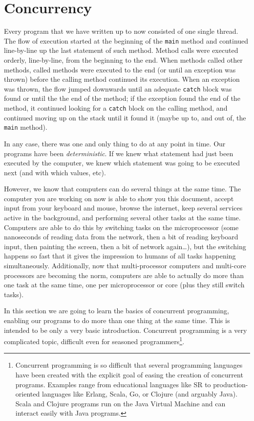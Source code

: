 \section{Concurrency}
\label{sec:concurrency}

Every program that we have written up to now consisted of one single
thread. The flow of execution started at the beginning of
the \verb+main+ method and continued line-by-line up the last
statement of such method. Method calls were executed orderly,
line-by-line, from the beginning to the end. When methods called other
methods, called methods were executed to the end (or until an
exception was thrown) before the calling method continued its
execution. When an exception was thrown, the flow jumped downwards
until an adequate \verb+catch+ block was found or until the the end of
the method; if the exception found the end of the method, it continued
looking for a \verb+catch+ block on the calling
method, and continued moving up on the stack until it found it 
(maybe up to, and out of, the \verb+main+ method). 

In any case, there was one and only thing to do at any point in
time. Our programs have been \emph{deterministic}. If we knew what
statement had just been executed by the computer, we knew which
statement was going to be executed next (and with which values, etc). 

However, we know that computers can do several things at the same
time. The computer you are working on now is able to show you this
document, accept input from your keyboard and mouse, browse the
internet, keep several services active in the background, and
performing several other tasks at the same time. 
Computers are able to do this by
switching tasks on the microprocessor (some nanoseconds of reading data from the
network, then a bit of reading keyboard input, then painting the
screen, then a bit of network again\ldots), but the switching happens so
fast that it gives the impression to humans of all tasks happening
simultaneously. Additionally, now that multi-processor computers and
multi-core processors are becoming the norm, computers are able to
actually do more than one task at the same time, one per
microprocessor or core (plus they still
switch tasks).

In this section we are going to learn the basics of concurrent
programming, enabling our programs to do more than one thing at the
same time. This is intended to be only a very basic
introduction. Concurrent programming is a very complicated topic,
difficult even
for seasoned programmers\footnote{Concurrent programming is so
  difficult that several programming languages have been 
  created with the explicit goal of easing the creation of concurrent
  programs. Examples range from educational languages like SR to
  production-oriented languages like Erlang, Scala, Go, or
  Clojure (and arguably Java). 
  Scala and Clojure programs run on the Java Virtual Machine and can
  interact easily with Java programs.}. 


